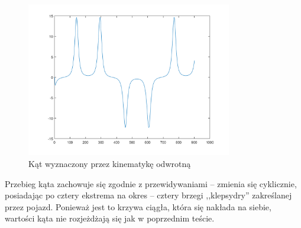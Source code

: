 \documentclass[a4paper, 12pt]{report}
\begin{document}
				\begin{figure}[H]
					\centering
					\includegraphics[width = 0.8\textwidth]{./AP/img/rev/lissajous_2_in_3.png}
					\caption{Kąt wyznaczony przez kinematykę odwrotną}
				\end{figure}
				\noindent Przebieg kąta zachowuje się zgodnie z przewidywaniami -- zmienia się cyklicznie, posiadając po cztery ekstrema na okres -- cztery brzegi ,,klepsydry'' zakreślanej przez pojazd. Ponieważ jest to krzywa ciągła, która się nakłada na siebie, wartości kąta nie rozjeżdżają się jak w poprzednim teście. 
			\newpage
\end{document}

